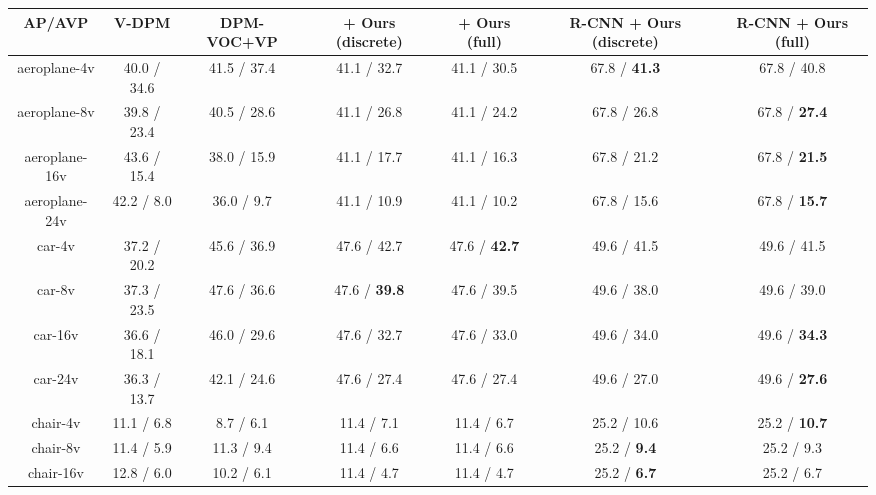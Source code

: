 %
\begin{table*}[t]
    \scriptsize
  \begin{center}
    \begin{tabular}{|c||c||c||c|c||c|c|}
    \hline
    AP/AVP              & V-DPM \cite{Xiang14} & DPM-VOC+VP \cite{Pepik12}  & \cite{Pepik12} + Ours (discrete) & \cite{Pepik12} + Ours (full) & R-CNN + Ours (discrete) & R-CNN + Ours (full)\\
    \hline\hline
    aeroplane-4v        & 40.0 / 34.6         & 41.5 / 37.4             & 41.1 / 32.7       & 41.1 / 30.5        & 67.8 / \textbf{41.3}         & 67.8 / 40.8 \\ \hline
    aeroplane-8v        & 39.8 / 23.4         & 40.5 / 28.6             & 41.1 / 26.8       & 41.1 / 24.2        & 67.8 / 26.8         & 67.8 / \textbf{27.4} \\ \hline
    aeroplane-16v       & 43.6 / 15.4         & 38.0 / 15.9             & 41.1 / 17.7       & 41.1 / 16.3        & 67.8 / 21.2         & 67.8 / \textbf{21.5} \\ \hline
    aeroplane-24v       & 42.2 / 8.0          & 36.0 /  9.7             & 41.1 / 10.9       & 41.1 / 10.2        & 67.8 / 15.6         & 67.8 / \textbf{15.7} \\ \hline
    \hline
    car-4v              & 37.2 / 20.2         & 45.6 / 36.9             & 47.6 / 42.7       & 47.6 / \textbf{42.7}        & 49.6 / 41.5         & 49.6 / 41.5\\ \hline
    car-8v              & 37.3 / 23.5         & 47.6 / 36.6             & 47.6 / \textbf{39.8}       & 47.6 / 39.5        & 49.6 / 38.0         & 49.6 / 39.0\\ \hline
    car-16v             & 36.6 / 18.1         & 46.0 / 29.6             & 47.6 / 32.7       & 47.6 / 33.0        & 49.6 / 34.0         & 49.6 / \textbf{34.3}\\ \hline
    car-24v             & 36.3 / 13.7         & 42.1 / 24.6             & 47.6 / 27.4       & 47.6 / 27.4        & 49.6 / 27.0         & 49.6 / \textbf{27.6}\\ \hline
    \hline
    chair-4v            & 11.1 / 6.8          & 8.7  / 6.1              &  11.4 / 7.1       & 11.4 / 6.7         & 25.2 / 10.6         & 25.2 / \textbf{10.7} \\ \hline
    chair-8v            & 11.4 / 5.9          & 11.3 / 9.4              &  11.4 / 6.6       & 11.4 / 6.6         & 25.2 / \textbf{9.4}          & 25.2 / 9.3 \\ \hline
    chair-16v           & 12.8 / 6.0          & 10.2 / 6.1              &  11.4 / 4.7       & 11.4 / 4.7         & 25.2 / \textbf{6.7}          & 25.2 / 6.7 \\ \hline

\end{tabular}
\end{center}
\end{table*}
